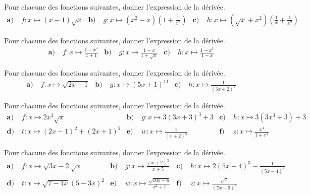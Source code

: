 \documentclass[11pt]{article}
\begin{document}
\begin{exo}[Produits]
  Pour chacune des fonctions suivantes, donner l'expression de la dérivée.
  \begin{align*}
    \textbf{a)}\;& f:x\mapsto (x-1)\sqrt x &
    \textbf{b)}\;& g:x\mapsto (x^2-x)\left( 1+\frac{1}{x^2} \right) &
    \textbf{c)}\;& h:x\mapsto (\sqrt x + x^2)\left( \frac{1}{x}+\frac{1}{x^2} \right)
  \end{align*}
\end{exo}

\begin{exo}[Quotients]
  Pour chacune des fonctions suivantes, donner l'expression de la dérivée.
  \begin{align*}
    \textbf{a)}\;& f:x\mapsto \frac{1+x^4}{x+1} &
    \textbf{b)}\;& g:x\mapsto \frac{1-x}{1+\sqrt x} &
    \textbf{c)}\;& h:x\mapsto \frac{1-x^3}{1-x}
  \end{align*}
\end{exo}

\begin{exo}[Compositions]
  Pour chacune des fonctions suivantes, donner l'expression de la dérivée.
  \begin{align*}
    \textbf{a)}\;& f:x\mapsto \sqrt{2x+1} &
    \textbf{b)}\;& g:x\mapsto (5x+1)^{11} &
    \textbf{c)}\;& h:x\mapsto \frac{1}{(3x+2)^7}
  \end{align*}
\end{exo}

\begin{exo}
  Pour chacune des fonctions suivantes, donner l'expression de la dérivée.
  \begin{align*}
    \textbf{a)}\;& f:x\mapsto 2x^3\sqrt{x} &
    \textbf{b)}\;& g:x\mapsto 3(3x+3)^3+3 &
    \textbf{c)}\;& h:x\mapsto 3(3x^3+3)+3 \\
    \textbf{d)}\;& t:x\mapsto (2x-1)^2+(2x+1)^2 &
    \textbf{e)}\;& w:x\mapsto \frac{1}{(x+2)^3} &
    \textbf{f)}\;& z:x\mapsto \frac{x^4}{1+x^2}
  \end{align*}
\end{exo}

\begin{exo}[$\star\star\star$]
  Pour chacune des fonctions suivantes, donner l'expression de la dérivée.
  \begin{align*}
    \textbf{a)}\;& f:x\mapsto \sqrt{3x-2}\sqrt{x} &
    \textbf{b)}\;& g:x\mapsto \frac{(x+2)^3}{x+5} &
    \textbf{c)}\;& h:x\mapsto 2(5x-4)^3-\frac{1}{(5x-4)^2} \\
    \textbf{d)}\;& t:x\mapsto \sqrt{7-4x}(5-3x)^2 &
    \textbf{e)}\;& w:x\mapsto \frac{\sqrt{10x-6}}{x^2+1} &
    \textbf{f)}\;& z:x\mapsto \frac{\sqrt x}{(7x-3)^3} \\
  \end{align*}
\end{exo}
\end{document}
